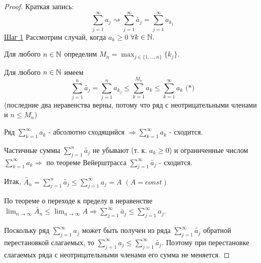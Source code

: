 	\begin{proof}
		Краткая запись:
		\[ \sum^{\infty}_{j = 1} a_j \rightsquigarrow \sum^{\infty}_{j = 1} \tilde{a_j} = \sum^{\infty}_{j = 1} a_{k_j} \]
		\underline{Шаг 1} Рассмотрим случай, когда $a_k \geqslant 0$ $\forall k \in \mathbb N.$
		
		Для любого $n \in \mathbb N$ определим $\displaystyle M_n = \max_{j \in \{1, \dots, n\}} \{k_j\}.$
		
		Для любого $n \in \mathbb N$ имеем
		\[ \sum_{j = 1}^n \tilde{a_j} = \sum_{j = 1}^n a_{k_j} \leqslant \sum_{k = 1}^{M_n} a_k \leqslant \sum^{\infty}_{k = 1} a_k \text{ (*)} \]
		(последние два неравенства верны, потому что ряд с неотрицательными членами и $n \leqslant M_n$)
		
		Ряд $\sum^{\infty}_{k = 1} a_k$ - абсолютно сходящийся $\Rightarrow \sum^{\infty}_{k = 1} a_k$ - сходится.
		
		Частичные суммы $\sum^n_{j = 1} \tilde{a_j}$ не убывают (т. к. $a_k \geqslant 0$) и ограниченные числом $\sum^{\infty}_{k = 1} a_k \Rightarrow$ по теореме Вейерштрасса $\sum^{\infty}_{j = 1} \tilde{a_j}$ - сходится.
		
		Итак, $\tilde{A_n} = \sum^n_{j = 1} \tilde{a_j} \leqslant \sum^{\infty}_{j = 1} a_j = A$ $(A = const)$
		
		По теореме о переходе к пределу в неравенстве $\lim_{n \to \infty} \tilde{A_n} \leqslant \lim_{n \to \infty} A \Rightarrow \sum^{\infty}_{j = 1} \tilde{a_j} \leqslant \sum^{\infty}_{j = 1} a_j.$
		
		Поскольку ряд $\sum^{\infty}_{j = 1} a_j$ может быть получен из ряда $\sum^{\infty}_{j = 1} \tilde{a_j}$ обратной перестановкой слагаемых, то $\sum^{\infty}_{j = 1} a_j \leqslant \sum^{\infty}_{j = 1} \tilde{a_j}$. Поэтому при перестановке слагаемых ряда с неотрицательными членами его сумма не меняется.
		

\end{proof}
